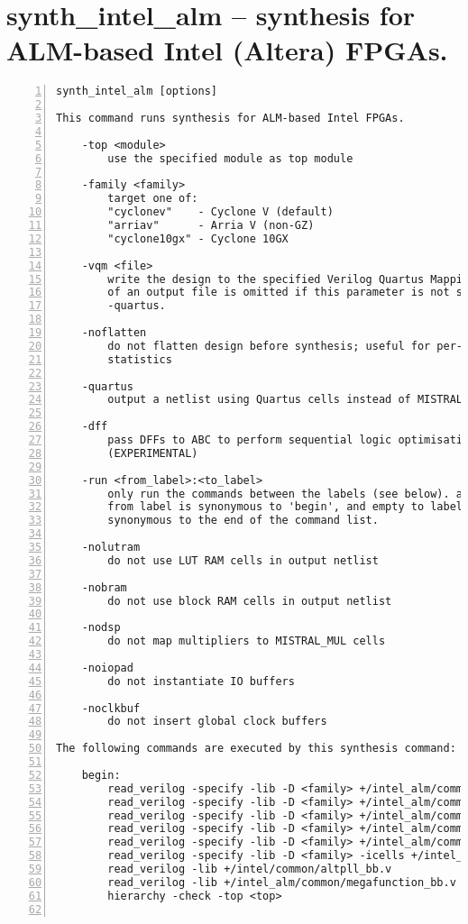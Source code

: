 \section{synth\_intel\_alm -- synthesis for ALM-based Intel (Altera) FPGAs.}
\label{cmd:synth_intel_alm}
\begin{lstlisting}[numbers=left,frame=single]
    synth_intel_alm [options]

This command runs synthesis for ALM-based Intel FPGAs.

    -top <module>
        use the specified module as top module

    -family <family>
        target one of:
        "cyclonev"    - Cyclone V (default)
        "arriav"      - Arria V (non-GZ)
        "cyclone10gx" - Cyclone 10GX

    -vqm <file>
        write the design to the specified Verilog Quartus Mapping File. Writing
        of an output file is omitted if this parameter is not specified. Implies
        -quartus.

    -noflatten
        do not flatten design before synthesis; useful for per-module area
        statistics

    -quartus
        output a netlist using Quartus cells instead of MISTRAL_* cells

    -dff
        pass DFFs to ABC to perform sequential logic optimisations
        (EXPERIMENTAL)

    -run <from_label>:<to_label>
        only run the commands between the labels (see below). an empty
        from label is synonymous to 'begin', and empty to label is
        synonymous to the end of the command list.

    -nolutram
        do not use LUT RAM cells in output netlist

    -nobram
        do not use block RAM cells in output netlist

    -nodsp
        do not map multipliers to MISTRAL_MUL cells

    -noiopad
        do not instantiate IO buffers

    -noclkbuf
        do not insert global clock buffers

The following commands are executed by this synthesis command:

    begin:
        read_verilog -specify -lib -D <family> +/intel_alm/common/alm_sim.v
        read_verilog -specify -lib -D <family> +/intel_alm/common/dff_sim.v
        read_verilog -specify -lib -D <family> +/intel_alm/common/dsp_sim.v
        read_verilog -specify -lib -D <family> +/intel_alm/common/mem_sim.v
        read_verilog -specify -lib -D <family> +/intel_alm/common/misc_sim.v
        read_verilog -specify -lib -D <family> -icells +/intel_alm/common/abc9_model.v
        read_verilog -lib +/intel/common/altpll_bb.v
        read_verilog -lib +/intel_alm/common/megafunction_bb.v
        hierarchy -check -top <top>


\end{lstlisting}
